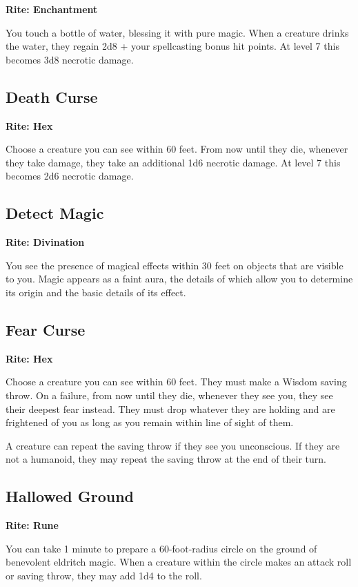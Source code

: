 \documentclass[12pt,letterpaper,twocolumn,openany,nodeprecatedcode,bg=none]{dndbook}
\let\oldsubsection\subsection
\renewcommand{\subsection}[1]{%
  \needspace{5\baselineskip}%
  \oldsubsection{#1}%
}
\begin{document}
\textbf{Rite: Enchantment}

You touch a bottle of water, blessing it with pure magic. When a
creature drinks the water, they regain 2d8 + your spellcasting bonus hit
points. At level 7 this becomes 3d8 necrotic damage.

\subsection{Death Curse}\label{death-curse}

\textbf{Rite: Hex}

Choose a creature you can see within 60 feet. From now until they die,
whenever they take damage, they take an additional 1d6 necrotic damage.
At level 7 this becomes 2d6 necrotic damage.

\subsection{Detect Magic}\label{detect-magic}

\textbf{Rite: Divination}

You see the presence of magical effects within 30 feet on objects that
are visible to you. Magic appears as a faint aura, the details of which
allow you to determine its origin and the basic details of its effect.

\subsection{Fear Curse}\label{fear-curse}

\textbf{Rite: Hex}

Choose a creature you can see within 60 feet. They must make a Wisdom
saving throw. On a failure, from now until they die, whenever they see
you, they see their deepest fear instead. They must drop whatever they
are holding and are frightened of you as long as you remain within line
of sight of them.

A creature can repeat the saving throw if they see you unconscious. If
they are not a humanoid, they may repeat the saving throw at the end of
their turn.

\subsection{Hallowed Ground}\label{hallowed-ground}

\textbf{Rite: Rune}

You can take 1 minute to prepare a 60-foot-radius circle on the ground
of benevolent eldritch magic. When a creature within the circle makes an
attack roll or saving throw, they may add 1d4 to the roll.
\end{document}
